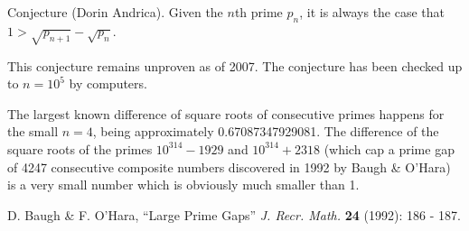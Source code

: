 \documentclass[12pt]{article}
\begin{document}
Conjecture (Dorin Andrica). Given the $n$th prime $p_n$, it is always the case that $1 > \sqrt{p_{n + 1}} - \sqrt{p_n}$.

This conjecture remains unproven as of 2007. The conjecture has been checked up to $n = 10^5$ by computers.

The largest known difference of square roots of consecutive primes happens for the small $n = 4$, being approximately 0.67087347929081. The difference of the square roots of the primes $10^{314} - 1929$ and $10^{314} + 2318$ (which cap a prime gap of 4247 consecutive composite numbers discovered in 1992 by Baugh \& O'Hara) is a very small number which is obviously much smaller than 1.

\begin{thebibliography}{1}
 D. Baugh \& F. O'Hara, ``Large Prime Gaps'' {\it J. Recr. Math.} {\bf 24} (1992): 186 - 187.
\end{thebibliography}
\end{document}
